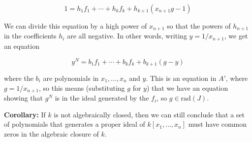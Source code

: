 \documentclass[]{article}
\begin{document}
\[
1=h_1 f_1 +\cdots + h_k f_k + h_{k+1}(x_{n+1}g-1)
\]

We can divide this equation by a high power of \(x_{n+1}\) so that the
powers of \(h_{n+1}\) in the coefficients \(h_{i}\) are all negative. In
other words, writing \(y=1/x_{n+1}\), we get an equation

\[
y^{N} = b_1 f_1 +\cdots +b_k f_k + b_{k+1}(g-y)
\]

where the \(b_{i}\) are polynomials in \(x_1,\ldots, x_n\) and \(y\).
This is an equation in \(A'\), where \(g=1/x_{n+1}\), so this means
(substituting \(g\) for \(y\)) that we have an equation showing that
\(g^{N}\) is in the ideal generated by the \(f_{i}\), so
\(g\in\mathrm{rad}(J)\).

\textbf{Corollary:} If \(k\) is not algebraically closed, then we can
still conclude that a set of polynomials that generates a proper ideal
of \(k[x_1,\ldots, x_n]\) must have common zeros in the algebraic
closure of \(k\).
\end{document}
